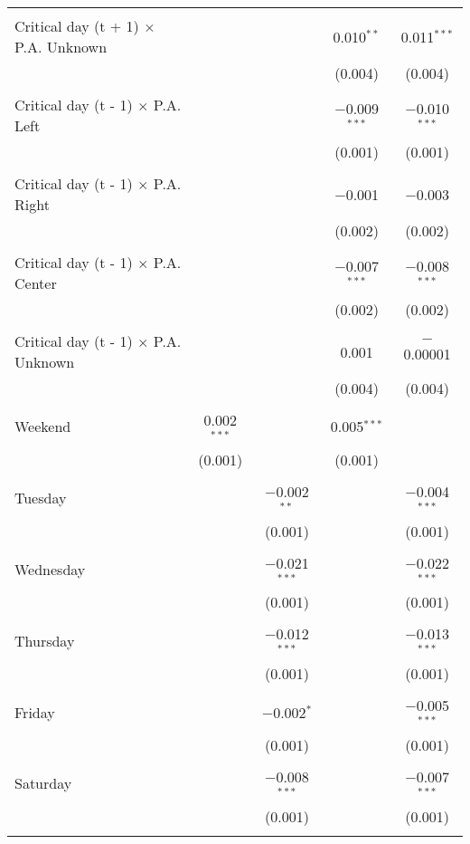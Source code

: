 \documentclass[
]{article}
\begin{document}
\begin{table}[!htbp]
{\begin{tabular}{@{\extracolsep{5pt}}lcccc}
  & & & & \\ 
 Critical day (t + 1) $\times$ P.A. Unknown &  &  & 0.010$^{**}$ & 0.011$^{***}$ \\ 
  &  &  & (0.004) & (0.004) \\ 
  & & & & \\ 
 Critical day (t - 1) $\times$ P.A. Left &  &  & $-$0.009$^{***}$ & $-$0.010$^{***}$ \\ 
  &  &  & (0.001) & (0.001) \\ 
  & & & & \\ 
 Critical day (t - 1) $\times$ P.A. Right &  &  & $-$0.001 & $-$0.003 \\ 
  &  &  & (0.002) & (0.002) \\ 
  & & & & \\ 
 Critical day (t - 1) $\times$ P.A. Center &  &  & $-$0.007$^{***}$ & $-$0.008$^{***}$ \\ 
  &  &  & (0.002) & (0.002) \\ 
  & & & & \\ 
 Critical day (t - 1) $\times$ P.A. Unknown &  &  & 0.001 & $-$0.00001 \\ 
  &  &  & (0.004) & (0.004) \\ 
  & & & & \\ 
 Weekend & 0.002$^{***}$ &  & 0.005$^{***}$ &  \\ 
  & (0.001) &  & (0.001) &  \\ 
  & & & & \\ 
 Tuesday &  & $-$0.002$^{**}$ &  & $-$0.004$^{***}$ \\ 
  &  & (0.001) &  & (0.001) \\ 
  & & & & \\ 
 Wednesday &  & $-$0.021$^{***}$ &  & $-$0.022$^{***}$ \\ 
  &  & (0.001) &  & (0.001) \\ 
  & & & & \\ 
 Thursday &  & $-$0.012$^{***}$ &  & $-$0.013$^{***}$ \\ 
  &  & (0.001) &  & (0.001) \\ 
  & & & & \\ 
 Friday &  & $-$0.002$^{*}$ &  & $-$0.005$^{***}$ \\ 
  &  & (0.001) &  & (0.001) \\ 
  & & & & \\ 
 Saturday &  & $-$0.008$^{***}$ &  & $-$0.007$^{***}$ \\ 
  &  & (0.001) &  & (0.001) \\ 
  & & & & \\ 

\end{tabular}}
\end{table}
\end{document}
